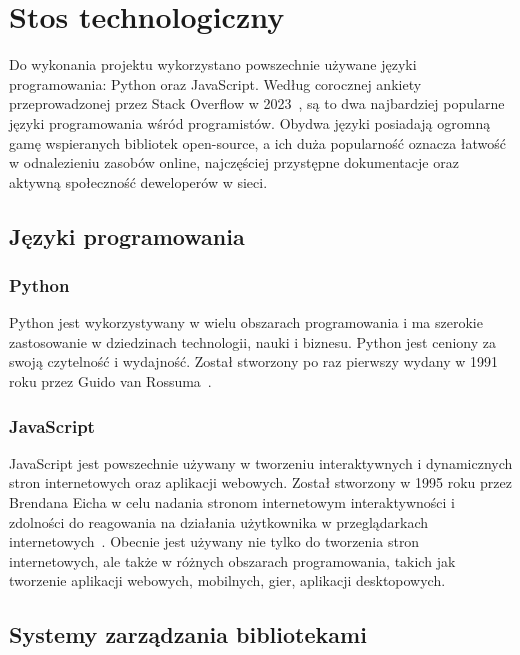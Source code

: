 \section{Stos technologiczny}
\label{sec:tech-stack}

Do wykonania projektu wykorzystano powszechnie używane języki programowania: Python oraz JavaScript. Według corocznej ankiety przeprowadzonej przez Stack Overflow w 2023~\cite{stackoverflow2023}, są to dwa najbardziej popularne języki programowania wśród programistów. Obydwa języki posiadają ogromną gamę wspieranych bibliotek open-source, a ich duża popularność oznacza łatwość w odnalezieniu zasobów online, najczęściej przystępne dokumentacje oraz aktywną społeczność deweloperów w sieci.

\subsection{Języki programowania}
\label{subsec:programming-languages}

\subsubsection{Python}
\label{subsubsec:python}

Python jest wykorzystywany w wielu obszarach programowania i ma szerokie zastosowanie w dziedzinach technologii, nauki i biznesu. Python jest ceniony za swoją czytelność i wydajność. Został stworzony po raz pierwszy wydany w 1991 roku przez Guido van Rossuma~\cite{vanRossum1995}.

\subsubsection{JavaScript}
\label{subsubsec:javascript}

JavaScript jest powszechnie używany w tworzeniu interaktywnych i dynamicznych stron internetowych oraz aplikacji webowych. Został stworzony w 1995 roku przez Brendana Eicha w celu nadania stronom internetowym interaktywności i zdolności do reagowania na działania użytkownika w przeglądarkach internetowych~\cite{severance2012}. Obecnie jest używany nie tylko do tworzenia stron internetowych, ale także w różnych obszarach programowania, takich jak tworzenie aplikacji webowych, mobilnych, gier, aplikacji desktopowych.

\subsection{Systemy zarządzania bibliotekami}
\label{subsec:package-managers}

